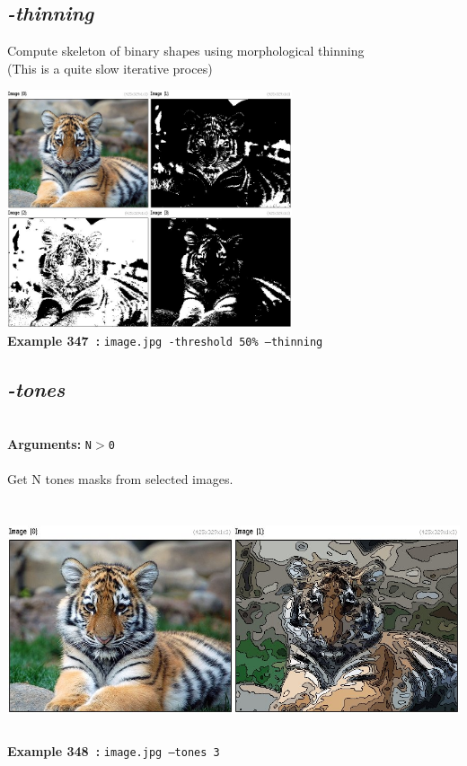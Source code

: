 \documentclass[a4paper,11pt,twoside]{book}
\begin{document}
\subsection{\emph{-thinning} }\vspace*{-0.5em}
Compute skeleton of binary shapes using morphological thinning
~\\(This is a quite slow iterative proces)
\begin{center}\includegraphics[keepaspectratio=true,height=7cm,width=\textwidth]{img/gmic_def347.jpg}\\
{\footnotesize \textbf{Example 347~:} \texttt{image.jpg -threshold 50\% --thinning}}
\end{center}

\subsection{\emph{-tones} }\vspace*{-0.5em}
~\\\textbf{Arguments: } 
{\small \texttt{N$>$0}}\\~\\
Get N tones masks from selected images.
\begin{center}\includegraphics[keepaspectratio=true,height=7cm,width=\textwidth]{img/gmic_def348.jpg}\\
{\footnotesize \textbf{Example 348~:} \texttt{image.jpg --tones 3}}
\end{center}
\end{document}
